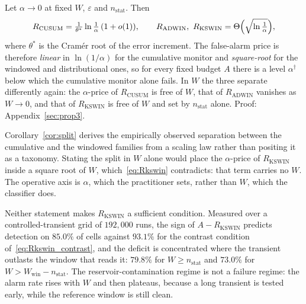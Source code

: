 \begin{corollary}\label{cor:split}
  Let $\alpha \to 0$ at fixed $W$, $\varepsilon$ and $n_{\mathrm{stat}}$. Then
  \begin{equation}\label{eq:split_alpha}
    R_{\mathrm{CUSUM}} = \tfrac{1}{\theta^*}\ln\tfrac{1}{\alpha}\,(1+o(1)),
    \qquad
    R_{\mathrm{ADWIN}},\ R_{\mathrm{KSWIN}}
      = \Theta\Bigl(\sqrt{\ln\tfrac{1}{\alpha}}\Bigr),
  \end{equation}
  where $\theta^*$ is the Cram\'er root of the error increment. The
  false-alarm price is therefore \emph{linear} in $\ln(1/\alpha)$ for the
  cumulative monitor and \emph{square-root} for the windowed and
  distributional ones, so for every fixed budget $A$ there is a level
  $\alpha^\dagger$ below which the cumulative monitor alone fails.
  In $W$ the three separate differently again: the $\alpha$-price of
  $R_{\mathrm{CUSUM}}$ is free of $W$, that of $R_{\mathrm{ADWIN}}$ vanishes as
  $W \to 0$, and that of $R_{\mathrm{KSWIN}}$ is free of $W$ and set by
  $n_{\mathrm{stat}}$ alone. Proof: Appendix~\ref{sec:prop3}.
\end{corollary}

Corollary~\ref{cor:split} derives the empirically observed separation between
the cumulative and the windowed families from a scaling law rather than
positing it as a taxonomy. Stating the split in $W$ alone would place the $\alpha$-price of $R_{\mathrm{KSWIN}}$ inside a square root of $W$, which~\eqref{eq:Rkswin} contradicts: that term carries no $W$. The
operative axis is $\alpha$, which the practitioner sets, rather than $W$, which
the classifier does.

Neither statement makes $R_{\mathrm{KSWIN}}$ a sufficient condition. Measured
over a controlled-transient grid of $192{,}000$ runs, the sign of
$A - R_{\mathrm{KSWIN}}$ predicts detection on $85.0\%$ of cells against
$93.1\%$ for the contrast condition of~\eqref{eq:Rkswin_contrast}, and the
deficit is concentrated where the transient outlasts the window that reads it:
$79.8\%$ for $W \ge n_{\mathrm{stat}}$ and $73.0\%$ for
$W > W_{\mathrm{win}} - n_{\mathrm{stat}}$. The reservoir-contamination regime
is not a failure regime: the alarm rate rises with $W$ and then plateaus,
because a long transient is tested early, while the reference window is still
clean.

